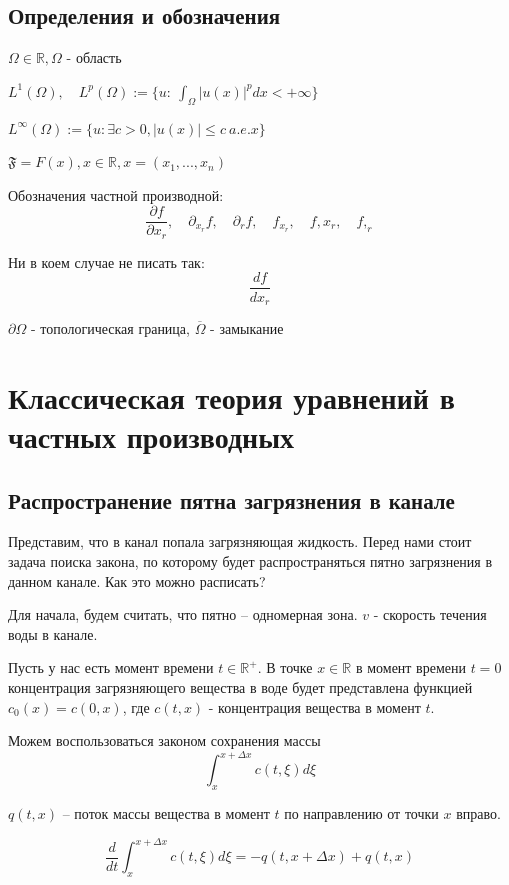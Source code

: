 \documentclass[12pt]{report}
\begin{document}
\section{Определения и обозначения}

$\Omega \in \mathbb{R}, \Omega$ - область

$L^1(\Omega), \quad L^p(\Omega) := \{ u: \: \int_{\Omega}|u(x)|^pdx < + \infty\}$

$L^\infty(\Omega) := \{ u: \exists c > 0, |u(x)| \le c \: a.e. x \}$

$\mathfrak{F} = F(x), x \in \mathbb{R}, x = (x_1, ..., x_n)$

Обозначения частной производной: 
$$
    \frac{\partial f}{\partial x_r}, \quad \partial_{x_r}f, \quad \partial_rf, \quad f_{x_r}, \quad f,x_r, \quad f, _r
$$

Ни в коем случае не писать так: 
$$
    \frac{df}{dx_r}
$$

$\partial \Omega$ - топологическая граница, $\overline{\Omega}$ - замыкание


\chapter{Классическая теория уравнений в частных производных}

\section{Распространение пятна загрязнения в канале}

Представим, что в канал попала загрязняющая жидкость. Перед нами стоит задача поиска закона,
по которому будет распространяться пятно загрязнения в данном канале. 
Как это можно расписать? 

Для начала, будем считать, что пятно -- одномерная зона. $v$ - скорость течения воды в канале. 

Пусть у нас есть момент времени $t \in \mathbb{R^+}$. В точке $x \in \mathbb{R}$ в момент времени $t = 0$ концентрация загрязняющего вещества в воде будет представлена функцией $c_0(x) = c(0, x)$, где $c(t,x)$ - концентрация вещества в момент $t$.

Можем воспользоваться законом сохранения массы
$$
    \int^{x + \Delta x}_{x}{c(t, \xi)d\xi}
$$

$q(t,x)$ -- поток массы вещества в момент $t$ по направлению от точки $x$ вправо.

$$\frac{d}{dt} \int^{x + \Delta x}_{x}{c(t, \xi)d\xi} = -q(t, x + \Delta x) + q(t, x)$$
\end{document}
